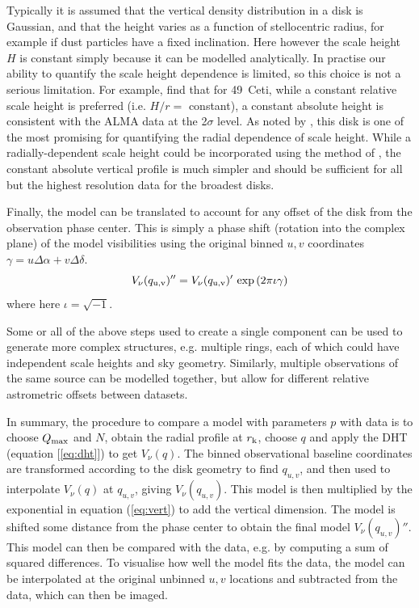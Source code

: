 \documentclass[fleqn,usenatbib]{rasti}
\begin{document}
Typically it is assumed that the vertical density distribution in a disk is Gaussian, and that the height varies as a function of stellocentric radius, for example if dust particles have a fixed inclination. Here however the scale height $H$ is constant simply because it can be modelled analytically. In practise our ability to quantify the scale height dependence is limited, so this choice is not a serious limitation. For example, \citet{2023MNRAS.524.1229T} find that for 49~Ceti, while a constant relative scale height is preferred (i.e. $H/r=$ constant), a constant absolute height is consistent with the ALMA data at the 2$\sigma$ level. As noted by \citet{2023MNRAS.524.1229T}, this disk is one of the most promising for quantifying the radial dependence of scale height. While a radially-dependent scale height could be incorporated using the method of \citet{2023MNRAS.524.1229T}, the constant absolute vertical profile is much simpler and should be sufficient for all but the highest resolution data for the broadest disks.

Finally, the model can be translated to account for any offset of the disk from the observation phase center. This is simply a phase shift (rotation into the complex plane) of the model visibilities using the original binned $u,v$ coordinates $\gamma = u \Delta \alpha + v \Delta \delta$.
\begin{equation}\label{eq:phase}
    V_\nu(q_{\rm u,v})'' = V_\nu(q_{\rm u,v})' \, \exp{(2 \pi \iota \gamma)}
\end{equation}
where here $\iota = \sqrt{-1}$.

Some or all of the above steps used to create a single component can be used to generate more complex structures, e.g. multiple rings, each of which could have independent scale heights and sky geometry. Similarly, multiple observations of the same source can be modelled together, but allow for different relative astrometric offsets between datasets.

In summary, the procedure to compare a model with parameters $p$ with data is to choose $Q_{\rm max}$ and $N$, obtain the radial profile at $r_{\rm k}$, choose $q$ and apply the DHT (equation [\ref{eq:dht}]) to get $V_\nu(q)$. The binned observational baseline coordinates are transformed according to the disk geometry to find $q_{u,v}$, and then used to interpolate $V_\nu(q)$ at $q_{u,v}$, giving $V_\nu(q_{u,v})$. This model is then multiplied by the exponential in equation (\ref{eq:vert}) to add the vertical dimension. The model is shifted some distance from the phase center to obtain the final model $V_\nu(q_{u,v})''$. This model can then be compared with the data, e.g. by computing a sum of squared differences. To visualise how well the model fits the data, the model can be interpolated at the original unbinned $u,v$ locations and subtracted from the data, which can then be imaged.
\end{document}
